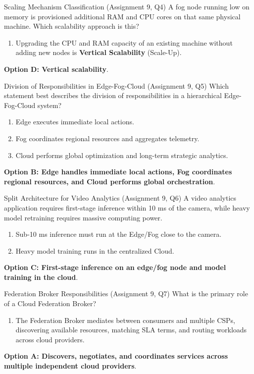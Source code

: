 \begin{solved}{Scaling Mechanism Classification (Assignment 9, Q4)}
\Given A fog node running low on memory is provisioned additional RAM and CPU cores on that same physical machine. Which scalability approach is this?
\Steps
\begin{enumerate}[leftmargin=*]
  \item Upgrading the CPU and RAM capacity of an existing machine without adding new nodes is \textbf{Vertical Scalability} (Scale-Up).
\end{enumerate}
\Answer \textbf{Option D: Vertical scalability}.
\end{solved}

\begin{solved}{Division of Responsibilities in Edge-Fog-Cloud (Assignment 9, Q5)}
\Given Which statement best describes the division of responsibilities in a hierarchical Edge-Fog-Cloud system?
\Steps
\begin{enumerate}[leftmargin=*]
  \item Edge executes immediate local actions.
  \item Fog coordinates regional resources and aggregates telemetry.
  \item Cloud performs global optimization and long-term strategic analytics.
\end{enumerate}
\Answer \textbf{Option B: Edge handles immediate local actions, Fog coordinates regional resources, and Cloud performs global orchestration}.
\end{solved}

\begin{solved}{Split Architecture for Video Analytics (Assignment 9, Q6)}
\Given A video analytics application requires first-stage inference within 10 ms of the camera, while heavy model retraining requires massive computing power.
\Steps
\begin{enumerate}[leftmargin=*]
  \item Sub-10 ms inference must run at the Edge/Fog close to the camera.
  \item Heavy model training runs in the centralized Cloud.
\end{enumerate}
\Answer \textbf{Option C: First-stage inference on an edge/fog node and model training in the cloud}.
\end{solved}

\begin{solved}{Federation Broker Responsibilities (Assignment 9, Q7)}
\Given What is the primary role of a Cloud Federation Broker?
\Steps
\begin{enumerate}[leftmargin=*]
  \item The Federation Broker mediates between consumers and multiple CSPs, discovering available resources, matching SLA terms, and routing workloads across cloud providers.
\end{enumerate}
\Answer \textbf{Option A: Discovers, negotiates, and coordinates services across multiple independent cloud providers}.
\end{solved}

